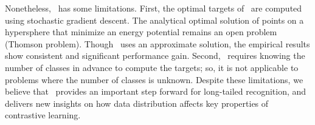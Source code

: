 Nonetheless, \name\ has some limitations. First, the optimal targets of \name\ are computed using stochastic gradient descent. The analytical optimal solution of points on a hypersphere that minimize an energy potential remains an open problem (Thomson problem). Though \name\ uses an approximate solution, the empirical results show consistent and significant performance gain. Second, \name~requires knowing the number of classes in advance to compute the targets; so, it is not applicable to problems where the number of classes is unknown. Despite these limitations, we believe that \name~provides an important step forward for long-tailed recognition, and delivers new insights on how data distribution affects key properties of contrastive learning. 

 {\small
   }

